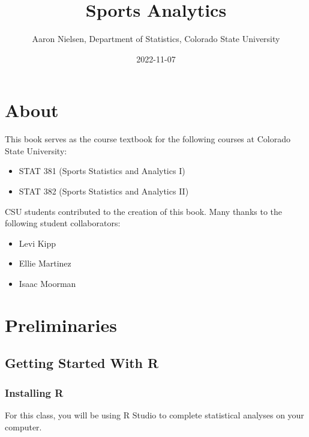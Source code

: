 \documentclass[
  11pt,
]{book}
\title{Sports Analytics}
\author{Aaron Nielsen, Department of Statistics, Colorado State University}
\date{2022-11-07}
\theoremstyle{definition}
\theoremstyle{definition}
\theoremstyle{definition}
\theoremstyle{definition}
\theoremstyle{remark}
\begin{document}
\maketitle

{
\setcounter{tocdepth}{1}
\tableofcontents
}
\hypertarget{about}{%
\chapter*{About}\label{about}}

This book serves as the course textbook for the following courses at Colorado State University:

\begin{itemize}
\item
  STAT 381 (Sports Statistics and Analytics I)
\item
  STAT 382 (Sports Statistics and Analytics II)
\end{itemize}

\hfill\break

CSU students contributed to the creation of this book. Many thanks to the following student collaborators:

\begin{itemize}
\item
  Levi Kipp
\item
  Ellie Martinez
\item
  Isaac Moorman
\end{itemize}

\hypertarget{preliminaries}{%
\chapter*{Preliminaries}\label{preliminaries}}

\hypertarget{getting-started-with-r}{%
\section*{Getting Started With R}\label{getting-started-with-r}}

\hypertarget{installing-r}{%
\subsection*{Installing R}\label{installing-r}}

For this class, you will be using R Studio to complete statistical analyses on your computer.
\end{document}
